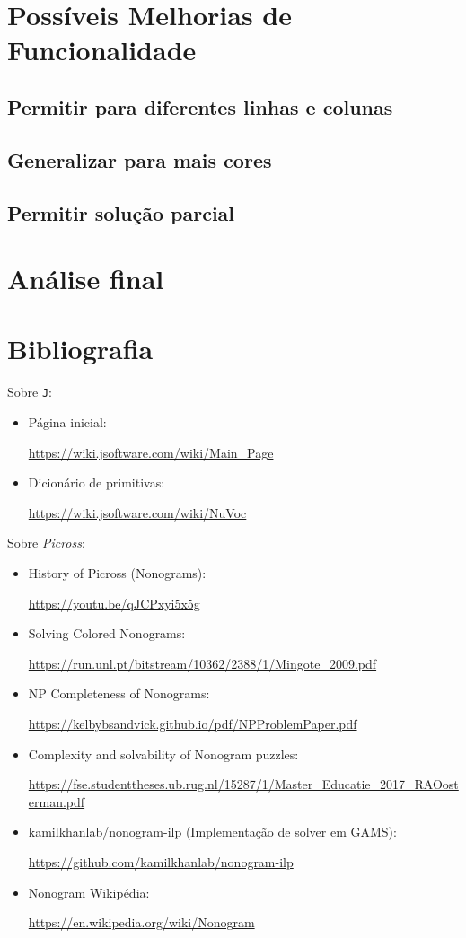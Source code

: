 \documentclass{article}
\newcommand{\lang}{\texttt{J}}
\begin{document}
\section{Possíveis Melhorias de Funcionalidade}
\subsection{Permitir para diferentes linhas e colunas}
\subsection{Generalizar para mais cores}
\subsection{Permitir solução parcial}

\section{Análise final}

\section{Bibliografia}

Sobre \lang{}:
\begin{itemize}
    \item Página inicial: \par
        \url{https://wiki.jsoftware.com/wiki/Main_Page}
    \item Dicionário de primitivas: \par
        \url{https://wiki.jsoftware.com/wiki/NuVoc}
\end{itemize}

Sobre \emph{Picross}:
\begin{itemize}
    \item History of Picross (Nonograms): \par
        \url{https://youtu.be/qJCPxyi5x5g}
    \item Solving Colored Nonograms: \par
        \url{https://run.unl.pt/bitstream/10362/2388/1/Mingote_2009.pdf}
    \item NP Completeness of Nonograms: \par
        \url{https://kelbybsandvick.github.io/pdf/NPProblemPaper.pdf}
    \item Complexity and solvability of Nonogram puzzles: \par
        \url{https://fse.studenttheses.ub.rug.nl/15287/1/Master_Educatie_2017_RAOosterman.pdf}
    \item kamilkhanlab/nonogram-ilp
        (Implementação de solver em GAMS): \par
        \url{https://github.com/kamilkhanlab/nonogram-ilp}
    \item Nonogram Wikipédia: \par
        \url{https://en.wikipedia.org/wiki/Nonogram}
\end{itemize}
\end{document}
